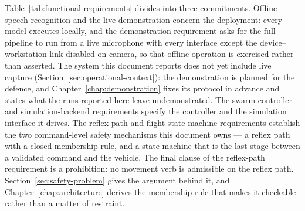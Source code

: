 Table~\ref{tab:functional-requirements} divides into three commitments. Offline speech recognition
and the live demonstration concern the deployment: every model executes locally, and the
demonstration requirement asks for the full pipeline to run from a live microphone with every
interface except the device--workstation link disabled on camera, so that offline operation is
exercised rather than asserted. The system this document reports does not yet include live capture
(Section~\ref{sec:operational-context}): the demonstration is planned for the defence, and
Chapter~\ref{chap:demonstration} fixes its protocol in advance and states what the runs reported
here leave undemonstrated. The
swarm-controller and simulation-backend requirements specify the controller and the simulation
interface it drives. The reflex-path and flight-state-machine requirements establish the two
command-level safety mechanisms this document owns --- a reflex path with a closed membership rule,
and a state machine that is the last stage between a validated command and the vehicle. The final
clause of the reflex-path requirement is a prohibition: no movement verb is admissible on the
reflex path. Section~\ref{sec:safety-problem} gives the argument behind it, and
Chapter~\ref{chap:architecture} derives the membership rule that makes it checkable rather than a
matter of restraint.

